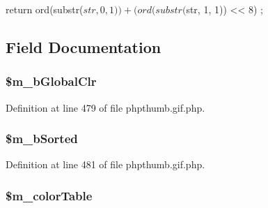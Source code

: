 \begin{DoxyCode}
        {
                return ord(substr($str, 0, 1)) + (ord(substr($str, 1, 1)) << 8)
      ;
        }
\end{DoxyCode}


\subsection{\-Field \-Documentation}
\hypertarget{class_c_g_i_f_f_i_l_e_h_e_a_d_e_r_a4b8efbf47c67f2369102f07264d165dc}{
\subsubsection[{\$m\-\_\-b\-Global\-Clr}]{\setlength{\rightskip}{0pt plus 5cm}\$m\-\_\-b\-Global\-Clr}}\label{class_c_g_i_f_f_i_l_e_h_e_a_d_e_r_a4b8efbf47c67f2369102f07264d165dc}


\-Definition at line 479 of file phpthumb.\-gif.\-php.

\hypertarget{class_c_g_i_f_f_i_l_e_h_e_a_d_e_r_a3f19f097a290d16035e4c27eb90bb13c}{
\subsubsection[{\$m\-\_\-b\-Sorted}]{\setlength{\rightskip}{0pt plus 5cm}\$m\-\_\-b\-Sorted}}\label{class_c_g_i_f_f_i_l_e_h_e_a_d_e_r_a3f19f097a290d16035e4c27eb90bb13c}


\-Definition at line 481 of file phpthumb.\-gif.\-php.

\hypertarget{class_c_g_i_f_f_i_l_e_h_e_a_d_e_r_ad3ef74e98fdac9e41e79be4f010029be}{
\subsubsection[{\$m\-\_\-color\-Table}]{\setlength{\rightskip}{0pt plus 5cm}\$m\-\_\-color\-Table}}\label{class_c_g_i_f_f_i_l_e_h_e_a_d_e_r_ad3ef74e98fdac9e41e79be4f010029be}


